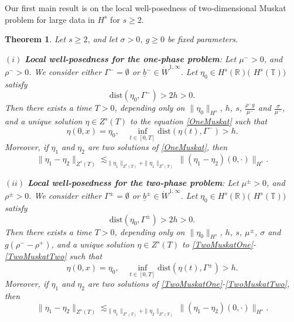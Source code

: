 \documentclass[12pt]{amsart}
\newtheorem{theorem}{Theorem}[section]
\theoremstyle{definition}
\numberwithin{equation}{section}
\newcommand{\R}{\mathbb{R}}
\begin{document}
Our first main result is on the local well-posedness of two-dimensional Muskat problem for large data in $H^s$ for $s \geq 2$.
\begin{theorem} \label{t:MainOne}
Let $s\geq 2$, and let $\sigma>0$, $g\geq 0$ be fixed parameters.

$(i)$ \textbf{Local well-posedness for the one-phase problem}: Let $\mu^- >0$, and $\rho^->0$.
We consider either $\Gamma^- = \emptyset$ or $\underline{b}^- \in \dot{W}^{1,\infty}$.
Let $\eta_0 \in H^s(\R) ($ $H^s(\mathbb{T}))$   satisfy 
\begin{equation*}
    \text{dist}(\eta_0, \Gamma^-)>2h>0.
\end{equation*}
Then there exists a time $T>0$, depending only on $\|\eta_0 \|_{H^s}$, $h$, $s$, $\frac{\rho^- g}{\mu^-}$ and $\frac{\sigma}{\mu^-}$, and a unique solution $\eta \in Z^s(T)$ to the equation \eqref{OneMuskat} such that
\begin{equation*}
    \eta(0,x) = \eta_0, \quad \inf_{t\in[0,T]}\text{dist}(\eta(t), \Gamma^-)>h.
\end{equation*}
Moreover, if $\eta_1$ and $\eta_2$ are two solutions of \eqref{OneMuskat}, then 
\begin{equation} \label{StabilityOne}
    \|\eta_1 - \eta_2 \|_{Z^s(T)} \lesssim_{\|\eta_1\|_{Z^s(T)} + \|\eta_1\|_{Z^s(T)}} \|(\eta_1 - \eta_2)(0,\cdot) \|_{H^s}.
\end{equation}

$(ii)$ \textbf{Local well-posedness for the two-phase problem}: Let $\mu^\pm >0$, and $\rho^\pm>0$.
We consider either $\Gamma^\pm = \emptyset$ or $\underline{b}^\pm \in \dot{W}^{1,\infty}$.
Let $\eta_0 \in H^s(\R) ($ $H^s(\mathbb{T}))$ satisfy 
\begin{equation*}
    \text{dist}(\eta_0, \Gamma^\pm)>2h>0.
\end{equation*}
Then there exists a time $T>0$, depending only on $\|\eta_0 \|_{H^s}$, $h$, $s$, $\mu^\pm$, $\sigma$ and $g(\rho^- -\rho^+)$, and a unique solution $\eta \in Z^s(T)$ to  \eqref{TwoMuskatOne}-\eqref{TwoMuskatTwo} such that
\begin{equation*}
    \eta(0,x) = \eta_0, \quad \inf_{t\in[0,T]}\text{dist}(\eta(t), \Gamma^\pm)>h.
\end{equation*}
Moreover, if $\eta_1$ and $\eta_2$ are two solutions of \eqref{TwoMuskatOne}-\eqref{TwoMuskatTwo}, then 
\begin{equation} \label{StabilityTwo}
    \|\eta_1 - \eta_2 \|_{Z^s(T)} \lesssim_{\|\eta_1\|_{Z^s(T)} + \|\eta_2\|_{Z^s(T)}} \|(\eta_1 - \eta_2)(0,\cdot) \|_{H^s}.
\end{equation}
\end{theorem}
\end{document}
